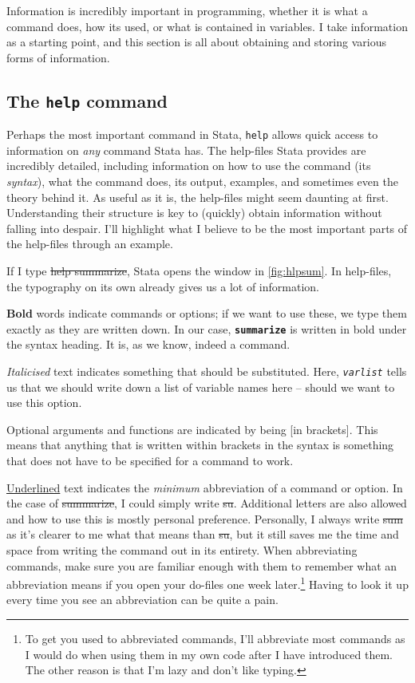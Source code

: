 
Information is incredibly important in programming,
whether it is what a command does, how its used,
or what is contained in variables.
I take information as a starting point,
and this section is all about obtaining and storing various forms of information.


\subsection{The \texttt{help} command}\label{sec:hlp}

Perhaps the most important command in Stata,
\texttt{help} allows quick access to information on \emph{any} command Stata has.
The help-files Stata provides are incredibly detailed,
including information on how to use the command (its \emph{syntax}),
what the command does, its output, examples,
and sometimes even the theory behind it.
As useful as it is, the help-files might seem daunting at first.
Understanding their structure is key to (quickly) obtain information without falling into despair.
I'll highlight what I believe to be the most important parts of the help-files through an example.

If I type \st{help summarize},
Stata opens the window in \cref{fig:hlpsum}.
In help-files, the typography on its own already gives us a lot of information.

\textbf{Bold} words indicate commands or options; if we want to use these,
we type them exactly as they are written down.
In our case,
\textbf{\texttt{summarize}} is written in bold under the syntax heading.
It is, as we know, indeed a command.

\textit{Italicised} text indicates something that should be substituted.
Here, \textit{\texttt{varlist}} tells us that we should write down a list of variable names here -- should we want to use this option.

Optional arguments and functions are indicated by being [in brackets].
This means that anything that is written within brackets in the syntax is something that does not have to be specified for a command to work.

\underline{Underlined} text indicates the \emph{minimum} abbreviation of a command or option.
In the case of \st{summarize},
I could simply write \st{su}.
Additional letters are also allowed and how to use this is mostly personal preference.
Personally, I always write \st{sum} as it's clearer to me what that means than \st{su},
but it still saves me the time and space from writing the command out in its entirety.
When abbreviating commands,
make sure you are familiar enough with them to remember what an abbreviation means if you open your do-files one week later.\footnote{%
To get you used to abbreviated commands,
I'll abbreviate most commands as I would do when using them in my own code after I have introduced them.
The other reason is that I'm lazy and don't like typing.}
Having to look it up every time you see an abbreviation can be quite a pain.

